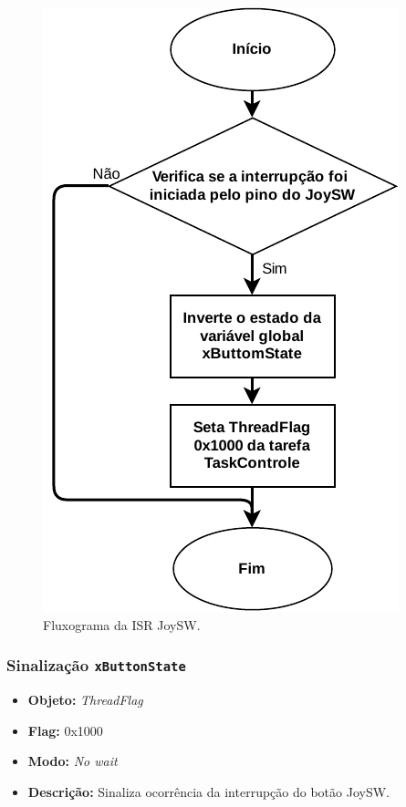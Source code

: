 \begin{figure}[H]
	\centering
	\includegraphics[height= 0.3\textheight]{img/fluxograma_joysw}
	\caption{Fluxograma da ISR JoySW.}
	\label{fig:fluxograma_joysw}
\end{figure}

\subsubsection*{Sinalização \texttt{xButtonState}}
	
	\begin{itemize}
		\item \textbf{Objeto:} \textit{ThreadFlag}
		\item \textbf{Flag:} 0x1000
		\item \textbf{Modo:} \textit{No wait}
		\item \textbf{Descrição:} Sinaliza ocorrência da interrupção do botão JoySW.
		
	\end{itemize}


